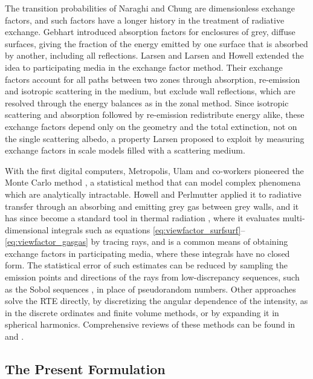 \documentclass[preprint,1p,times]{elsarticle}
\theoremstyle{plain}
\theoremstyle{definition}
\theoremstyle{remark}
\begin{document}
The transition probabilities of Naraghi and Chung are dimensionless exchange factors, and such factors have a longer history in the treatment of radiative exchange. Gebhart \citep{Gebhart1961} introduced absorption factors for enclosures of grey, diffuse surfaces, giving the fraction of the energy emitted by one surface that is absorbed by another, including all reflections. Larsen \citep{Larsen1983} and Larsen and Howell \citep{LarsenHowell1985} extended the idea to participating media in the exchange factor method. Their exchange factors account for all paths between two zones through absorption, re-emission and isotropic scattering in the medium, but exclude wall reflections, which are resolved through the energy balances as in the zonal method. Since isotropic scattering and absorption followed by re-emission redistribute energy alike, these exchange factors depend only on the geometry and the total extinction, not on the single scattering albedo, a property Larsen proposed to exploit by measuring exchange factors in scale models filled with a scattering medium.

With the first digital computers, Metropolis, Ulam and co-workers pioneered the Monte Carlo method \citep{MetropolisUlam1949}, a statistical method that can model complex phenomena which are analytically intractable. Howell and Perlmutter \citep{HowellPerlmutter1964} applied it to radiative transfer through an absorbing and emitting grey gas between grey walls, and it has since become a standard tool in thermal radiation \citep{MonteCarloPastFuture2021}, where it evaluates multi-dimensional integrals such as equations \eqref{eq:viewfactor_surfsurf}--\eqref{eq:viewfactor_gasgas} by tracing rays, and is a common means of obtaining exchange factors in participating media, where these integrals have no closed form. The statistical error of such estimates can be reduced by sampling the emission points and directions of the rays from low-discrepancy sequences, such as the Sobol sequences \citep{Sobol1967, JoeKuo2008}, in place of pseudorandom numbers. Other approaches solve the RTE directly, by discretizing the angular dependence of the intensity, as in the discrete ordinates and finite volume methods, or by expanding it in spherical harmonics. Comprehensive reviews of these methods can be found in \citep{Daun2021} and \citep{Modest2022}.

\subsection{The Present Formulation}
\end{document}
